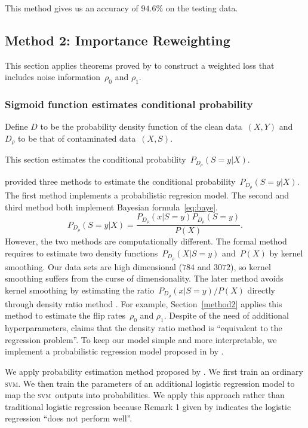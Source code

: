 \documentclass[12pt]{article} %
\newcommand{\svm}{\textsc{svm}}
\begin{document}
This method gives us an accuracy of $94.6\%$ on the testing data.


\subsection{Method 2: Importance Reweighting} \label{3rd}
This section applies theorems proved by \citet{liu2016classification} to construct a weighted loss that includes noise information~$\rho_0$ and $\rho_1$. 

\subsubsection{Sigmoid function estimates conditional probability}\label{sigmoid}
Define $D$ to be the probability density function of the clean data~$(X,Y)$ and $D_\rho$ to be that of contaminated data~$(X,S)$.

This section estimates the conditional probability~$P_{D_\rho}(S=y|X)$.

\citet{liu2016classification} provided three methods to estimate the conditional probability~$P_{D_\rho}(S=y|X)$. 
The first method implements a probabilistic regresion model. 
The second and third method both implement Bayesian formula~\eqref{eq:baye}.
\begin{equation*}
   P_{D_\rho}(S=y|X)=\frac{P_{D_\rho}(x|S=y)P_{D_\rho}(S=y)}{P(X)}.
\end{equation*}
However, the two methods are computationally different. The formal method requires to estimate two density functions~$P_{D_\rho}(X|S=y)$ and~$P(X)$ by kernel smoothing. Our data sets are high dimensional ($784$ and $3072$), so kernel smoothing suffers from the curse of dimensionality. The later method avoids kernel smoothing by estimating the ratio~$P_{D_\rho}(x|S=y)/P(X)$ directly through density ratio method \citep{liu2016classification}. For example, Section~\ref{method2} applies this method to estimate the flip rates~$\rho_0$ and $\rho_1$. Despite of the need of additional hyperparameters,  \citet{Sugiyama10densityratio} claims that the density ratio method is ``equivalent to the regression problem''. To keep our model simple and more interpretable, we implement a probabilistic regression model proposed in by \citet[Section~5.1]{liu2016classification}. 

We apply probability estimation method proposed by \citet{Platt99probabilisticoutputs}. We first train an ordinary \svm . We then train the parameters of an additional logistic regression model to map the \svm\ outputs into probabilities. We apply this approach rather than traditional logistic regression because Remark 1 given by \citet{liu2016classification} indicates the logistic regression ``does not perform well''.
\end{document}
